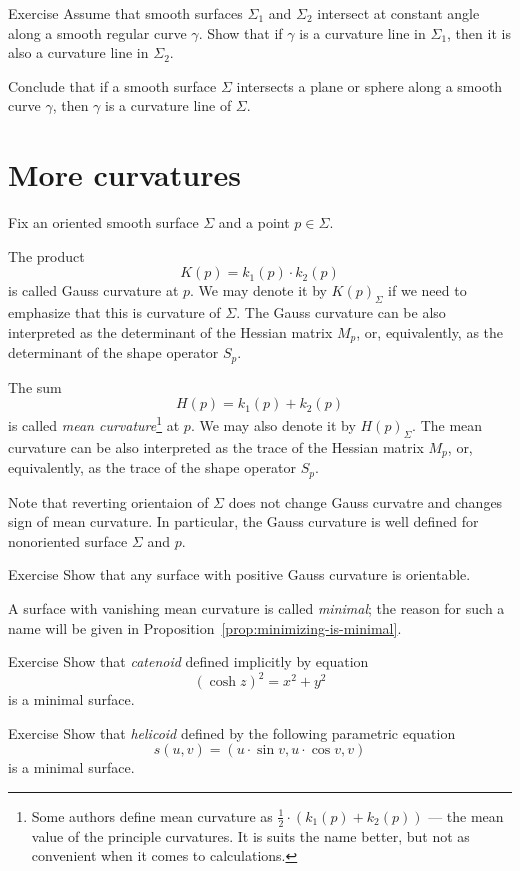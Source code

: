 \begin{thm}{Exercise}\label{ex:shape-curvature-line}
Assume that smooth surfaces $\Sigma_1$ and $\Sigma_2$ intersect at constant angle along a smooth regular curve $\gamma$.
Show that if $\gamma$ is a curvature line in $\Sigma_1$, then it is also a curvature line in $\Sigma_2$.

Conclude that if a smooth surface $\Sigma$ intersects a plane or sphere along a smooth curve $\gamma$,
then $\gamma$ is a curvature line of $\Sigma$.
\end{thm}


\section*{More curvatures}

Fix an oriented smooth surface $\Sigma$ and a point $p\in\Sigma$.

The product 
\[K(p)=k_1(p)\cdot k_2(p)\]
is called Gauss curvature at $p$.
We may denote it by $K(p)_\Sigma$ if we need to emphasize that this is curvature of $\Sigma$.
The Gauss curvature can be also interpreted as the determinant of the Hessian matrix $M_p$, or, equivalently,  as the determinant of the shape operator $S_p$.

The sum 
\[H(p)=k_1(p)+ k_2(p)\] 
is called \emph{mean curvature}\footnote{Some authors define mean curvature as $\tfrac12\cdot(k_1(p)+ k_2(p))$ --- the mean value of the principle curvatures. It is suits the name better, but not as convenient when it comes to calculations.} at $p$.
We may also denote it by $H(p)_\Sigma$.
The mean curvature can be also interpreted as the trace of the Hessian matrix $M_p$, or, equivalently,  as the trace of the shape operator $S_p$. 

Note that reverting orientaion of $\Sigma$ does not change Gauss curvatre and changes sign of mean curvature.
In particular, the Gauss curvature is well defined for nonoriented surface $\Sigma$ and $p$.

\begin{thm}{Exercise}\label{ex:gauss+orientable}
Show that any surface with positive Gauss curvature is orientable. 
\end{thm}

A surface with vanishing mean curvature is called \emph{minimal};
the reason for such a name will be given in Proposition~\ref{prop:minimizing-is-minimal}.

\begin{thm}{Exercise}\label{ex:catenoid-is-minimal}
Show that \emph{catenoid} defined implicitly by equation
\[(\cosh z)^2=x^2+y^2\]
is a minimal surface.
\end{thm}

\begin{thm}{Exercise}\label{ex:helicoid-is-minimal}
Show that \emph{helicoid} defined by the following parametric equation
\[s(u,v)=(u\cdot \sin v,u\cdot \cos v,v)\]
is a minimal surface.
\end{thm}

